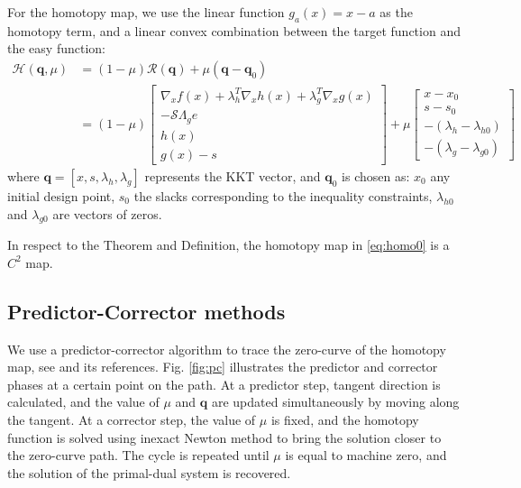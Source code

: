 \documentclass{article}
\theoremstyle{definition}
\begin{document}
For the homotopy map, we use the linear function $g_a(x) = x - a$ as the homotopy term, and a linear convex combination between the target function and the easy function:
\begin{equation}\label{eq:homo0}
\begin{aligned}
\mathcal{H}(\boldsymbol{q}, \mu) &= (1-\mu) \mathcal{R}(\boldsymbol{q}) + \mu(\boldsymbol{q} - \boldsymbol{q}_0) \\ 
&= (1-\mu) \begin{bmatrix}
\nabla_x f(x)  + \lambda_h^T \nabla_x h(x)  + \lambda_g^T \nabla_x g(x)   \\
-\mathcal{S}\Lambda_g e \\
h(x) \\
g(x) - s 
\end{bmatrix}  + \mu 
\begin{bmatrix}
x-x_0 \\
s-s_0 \\
- (\lambda_h - \lambda_{h0} )  \\
- (\lambda_g - \lambda_{g0} ) 
\end{bmatrix}
\end{aligned}
\end{equation}
where $\boldsymbol{q} = [x, s, \lambda_{h}, \lambda_{g}]$ represents the KKT vector, and $\boldsymbol{q}_0$ is chosen as: $x_0$ any initial design point, $s_0$ the slacks corresponding to the inequality constraints, $\lambda_{h0}$ and $\lambda_{g0}$ are vectors of zeros.

In respect to the Theorem and Definition, the homotopy map in \eqref{eq:homo0} is a $C^2$ map. 


\subsection{Predictor-Corrector methods}
We use a predictor-corrector algorithm to trace the zero-curve of the homotopy map, see \cite{allgower_georg_1993} and its references. Fig. \ref{fig:pc} illustrates the predictor and corrector phases at a certain point on the path. At a predictor step, tangent direction is calculated, and the value of $\mu$ and $\boldsymbol{q}$ are updated simultaneously by moving along the tangent. At a corrector step, the value of $\mu$ is fixed, and the homotopy function is solved using inexact Newton method to bring the solution closer to the zero-curve path. The cycle is repeated until $\mu$ is equal to machine zero, and the solution of the primal-dual system is recovered.
\end{document}
